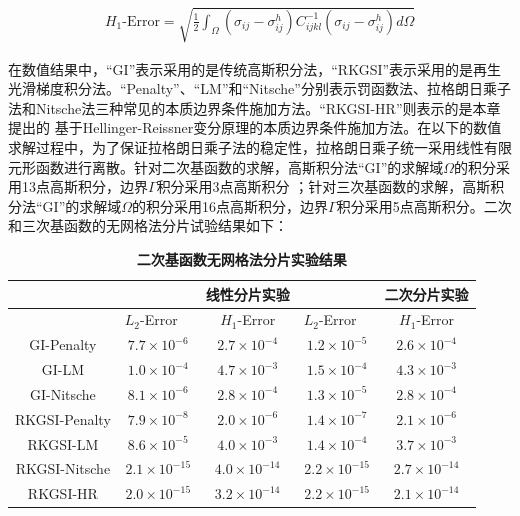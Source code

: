 \begin{equation}
    \begin{split}
        H_1\text{-Error}=\sqrt{\frac{1}{2}\int_{\Omega}(\sigma_{ij}-\sigma_{ij}^h)C_{ijkl}^{-1}(\sigma_{ij}-\sigma_{ij}^h)d\Omega}
    \end{split}
    \end{equation}\par
在数值结果中，“GI”表示采用的是传统高斯积分法，“RKGSI”表示采用的是再生光滑梯度积分法。“Penalty”、“LM”和“Nitsche”分别表示罚函数法、拉格朗日乘子法和Nitsche法三种常见的本质边界条件施加方法。“RKGSI-HR”则表示的是本章提出的
基于Hellinger-Reissner变分原理的本质边界条件施加方法。在以下的数值求解过程中，为了保证拉格朗日乘子法的稳定性，拉格朗日乘子统一采用线性有限元形函数进行离散。针对二次基函数的求解，高斯积分法“GI”的求解域$\Omega$的积分采用13点高斯积分，边界$\Gamma$积分采用3点高斯积分
；针对三次基函数的求解，高斯积分法“GI”的求解域$\Omega$的积分采用16点高斯积分，边界$\Gamma$积分采用5点高斯积分。二次和三次基函数的无网格法分片试验结果如下：\par
\begin{table}[h]
    \caption{\textbf{二次基函数无网格法分片实验结果}}
    \centering
   \begin{tabular}{ccccc}
   \toprule
   &$\quad$ &线性分片实验 &$\quad$ &二次分片实验\\
   \midrule
   &$L_2$-Error$\quad$&$H_1$-Error&$L_2$-Error$\quad$&$H_1$-Error\\
   \midrule
   GI-Penalty&$7.7\times10^{-6}$&$2.7\times10^{-4}$&$1.2\times10^{-5}$&$2.6\times10^{-4}$\\
   GI-LM&$1.0\times10^{-4}$&$4.7\times10^{-3}$&$1.5\times10^{-4}$&$4.3\times10^{-3}$\\
   GI-Nitsche&$8.1\times10^{-6}$&$2.8\times10^{-4}$&$1.3\times10^{-5}$&$2.8\times10^{-4}$\\
  RKGSI-Penalty&$7.9\times10^{-8}$&$2.0\times10^{-6}$&$1.4\times10^{-7}$&$2.1\times10^{-6}$\\
  RKGSI-LM&$8.6\times10^{-5}$&$4.0\times10^{-3}$&$1.4\times10^{-4}$&$3.7\times10^{-3}$\\
  RKGSI-Nitsche&$2.1\times10^{-15}$&$4.0\times10^{-14}$&$2.2\times10^{-15}$&$2.7\times10^{-14}$\\
  RKGSI-HR&$2.0\times10^{-15}$&$3.2\times10^{-14}$&$2.2\times10^{-15}$&$2.1\times10^{-14}$\\
   \bottomrule
   \end{tabular}
   \end{table}
